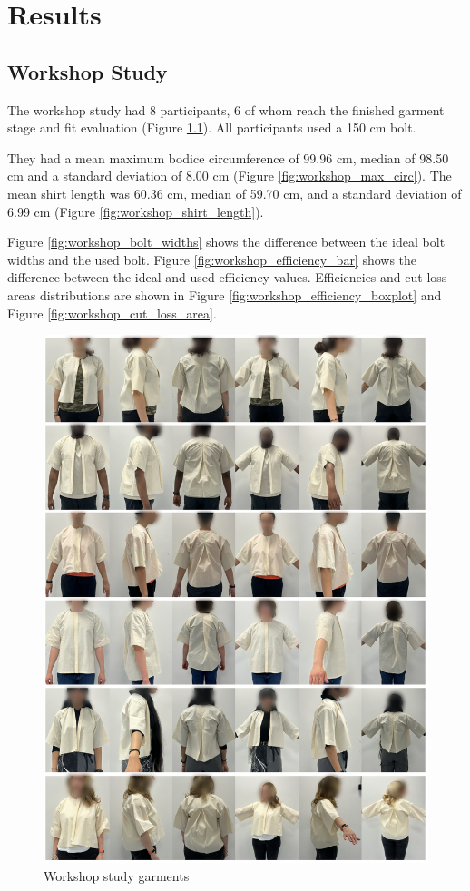 \chapter{Results}

\section{Workshop Study}
The workshop study had 8 participants, 6 of whom reach the finished garment stage and fit evaluation (Figure \ref{fig:workshop_garments}). All participants used a 150 cm bolt.

They had a mean maximum bodice circumference of 99.96 cm, median of 98.50 cm and a standard deviation of 8.00 cm (Figure \ref{fig:workshop_max_circ}). The mean shirt length was 60.36 cm, median of 59.70 cm, and a standard deviation of 6.99 cm (Figure \ref{fig:workshop_shirt_length}).

Figure \ref{fig:workshop_bolt_widths} shows the difference between the ideal bolt widths and the used bolt. Figure \ref{fig:workshop_efficiency_bar} shows the difference between the ideal and used efficiency values. Efficiencies and cut loss areas distributions are shown in Figure \ref{fig:workshop_efficiency_boxplot} and Figure \ref{fig:workshop_cut_loss_area}.
\newpage
\begin{figure} [H]
    \centering
    \includegraphics[width = \textwidth]{Images/workshop garments.png}
    \caption{Workshop study garments}
    \label{fig:workshop_garments}
\end{figure}

